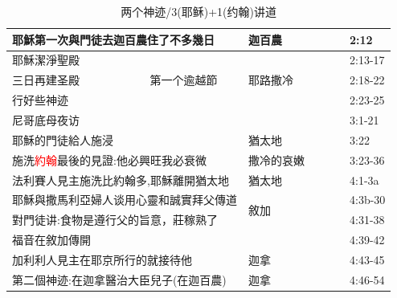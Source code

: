 \begin{table}[H]
\begin{tabular}{p{6.45em}|c|p{4.785em}|r|p{}|p{3.23em}|p{3.5em}}
\multicolumn{2}{p{20.5em}|}{耶穌第一次與門徒去迦百農住了不多幾日}&迦百農&&&&2:12\\\midrule

耶穌潔淨聖殿 & 
\multicolumn{1}{c|}{\multirow{3}[6]{*}{第一个逾越節}} &
\multicolumn{1}{l|}{\multirow{3}[6]{*}{耶路撒冷}}&&&&2:13-17\\

\cmidrule{1-1}\cmidrule{4-7}三日再建圣殿&&&&&& 2:18-22 \\
\cmidrule{1-1}\cmidrule{4-7} 行好些神迹 &（共四个逾越节）&&&&& 2:23-25 \\
\cmidrule{1-1}\cmidrule{4-7} 尼哥底母夜访&&&&&&3:1-21\\\midrule

\multicolumn{2}{p{20.5em}|}{耶穌的門徒給人施浸} & \multicolumn{1}{p{5.355em}|}{猶太地} &       &       &       & 3:22\\\midrule

\multicolumn{2}{p{20.5em}|}{施洗\textcolor{red}{約翰}最後的見證:他必興旺我必衰微} & \multicolumn{1}{p{5.355em}|}{撒冷的哀嫩} &       &       &       & 3:23-36 \\ \midrule

\multicolumn{2}{p{20.5em}|}{法利賽人見主施洗比約翰多,耶穌離開猶太地} & \multicolumn{1}{p{5.355em}|}{猶太地} &       &       &       & 4:1-3a\\\midrule

\multicolumn{2}{p{20.5em}|}{耶穌與撒馬利亞婦人谈用心靈和誠實拜父傳道} & 
\multicolumn{1}{l|}{\multirow{2}[6]{*}{敘加}} &       &       &       & 4:3b-30\\

\cmidrule{1-2}\cmidrule{4-7}\multicolumn{2}{p{20.5em}|}{對門徒讲:食物是遵行父的旨意，莊稼熟了} &  &       &       &       & 4:31-38\\ 

\cmidrule{1-2}\cmidrule{4-7}\multicolumn{2}{p{20.5em}|}{福音在敘加傳開} &  &       &       &       & 4:39-42 \\ \midrule

\multicolumn{2}{p{20.5em}|}{加利利人見主在耶京所行的就接待他} & \multicolumn{1}{p{5.355em}|}{迦拿} &       &       &       & 4:43-45 \\ \midrule
\multicolumn{2}{p{20.5em}|}{第二個神迹:在迦拿醫治大臣兒子(在迦百農)} & \multicolumn{1}{p{5.355em}|}{迦拿} &       &       &       & 4:46-54 \\ \midrule
\end{tabular}
\caption{两个神迹/3(耶稣)+1(约翰)讲道}
\end{table}


